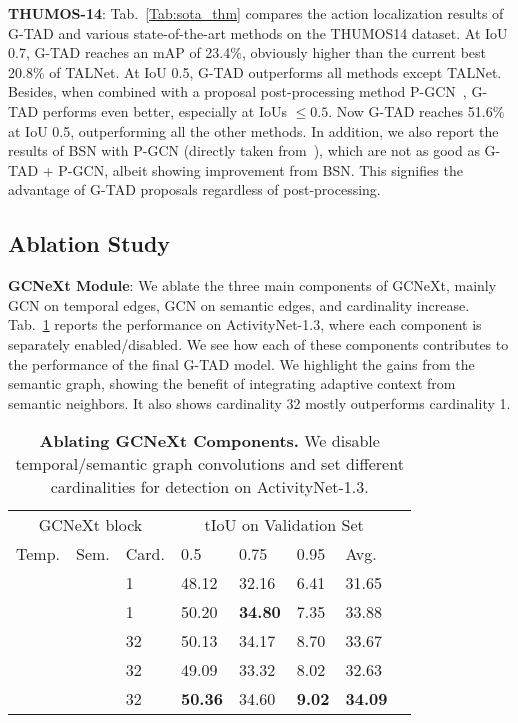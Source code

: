 \documentclass[10pt,twocolumn,letterpaper]{article}
\newcommand{\cmark}{\ding{51}}\newcommand{\xmark}{\ding{55}}
\begin{document}
\noindent
{\bf THUMOS-14}: Tab.~\ref{Tab:sota_thm} compares the action localization results of G-TAD and various state-of-the-art methods on the THUMOS14 dataset. At IoU 0.7, G-TAD reaches an mAP of
23.4\%, obviously higher than the current best 20.8\% of TALNet. At IoU 0.5, G-TAD outperforms all methods except TALNet.
Besides, when combined with a proposal post-processing method P-GCN~\cite{zeng2019graph}, G-TAD performs even better, especially at IoUs $\leq 0.5$. Now G-TAD reaches 51.6\% at IoU 0.5, outperforming all the other methods. In addition, we also report the results of BSN with P-GCN (directly taken from~\cite{zeng2019graph}), which are not as good as G-TAD + P-GCN, albeit showing improvement from BSN. This signifies the advantage of G-TAD proposals regardless of post-processing. 






\subsection{Ablation Study} \label{subsec:abl}

\noindent
\textbf{GCNeXt Module}: We ablate the three main components of GCNeXt, mainly GCN on temporal edges, GCN on semantic edges, and cardinality increase. 
Tab.~\ref{tab:abl_gcnext} reports the performance on ActivityNet-1.3, where each component is separately enabled/disabled. We see how each of these components contributes to the performance of the final G-TAD model. We highlight the gains from the semantic graph, showing the benefit of integrating adaptive context from semantic neighbors. It also shows cardinality 32 mostly outperforms cardinality 1.


\begin{table}[tbp]
\centering
\caption{\textbf{Ablating GCNeXt Components.} We disable temporal/semantic graph convolutions and set different cardinalities for detection on ActivityNet-1.3.   }
\small
\begin{tabular}{p{0.7cm}<{\centering}p{0.7cm}<{\centering}p{0.7cm}<{\centering}|p{0.65cm}<{\centering}p{0.65cm}<{\centering}p{0.65cm}<{\centering}p{0.55cm}<{\centering}p{0.65cm}<{\centering}}
\hline
\multicolumn{3}{c|}{ GCNeXt block} & \multicolumn{4}{c}{tIoU on Validation Set}\\
Temp. & Sem.  & Card.  & 0.5  &  0.75  & 0.95  & Avg. \\
\hline
\xmark & \xmark & 1 & {48.12} & {32.16} & 6.41 & {31.65} \\ \hline
\cmark & \cmark & 1 & {50.20} & \textbf{34.80} & 7.35 & {33.88} \\
\cmark & \xmark & 32& {50.13} & {34.17} & {8.70} & {33.67} \\
\xmark & \cmark & 32& {49.09} & {33.32} & 8.02 & {32.63} \\ \hline
\cmark & \cmark & 32& {\textbf{50.36}} & {{34.60}} & \textbf{9.02} & {\textbf{34.09}} \\
\hline
\end{tabular}
\label{tab:abl_gcnext}
\end{table}
\end{document}
